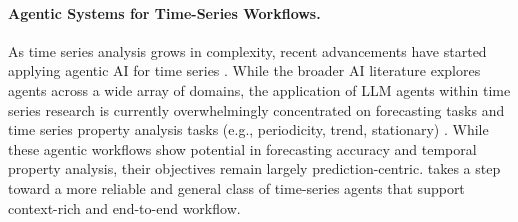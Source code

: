 \paragraph{Agentic Systems for Time-Series Workflows.}

As time series analysis grows in complexity, recent advancements have started applying agentic AI for time series \citep{DBLP:journals/corr/abs-2601-13653, DBLP:journals/corr/abs-2510-07432}. 
While the broader AI literature explores agents across a wide array of domains, the application of LLM agents within time series research is currently overwhelmingly concentrated on forecasting tasks and time series property analysis tasks (e.g., periodicity, trend, stationary) \citep{DBLP:journals/corr/abs-2509-11575, DBLP:journals/corr/abs-2510-01538, lee2025timecap, huang2026many}. 
While these agentic workflows show potential in forecasting accuracy and temporal property analysis, their objectives remain largely prediction-centric. \method takes a step toward a more reliable and general class of time-series agents that support context-rich and end-to-end workflow.

